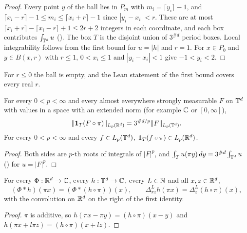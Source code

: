 \begin{proof}
\leanok
Every point $y$ of the ball lies in $P_m$ with $m_i = \lceil y_i \rceil - 1$, and
$\lceil x_i - r \rceil - 1 \leq m_i \leq \lceil x_i + r \rceil - 1$ since $|y_i - x_i| < r$. These
are at most $\lceil x_i + r \rceil - \lceil x_i - r \rceil + 1 \leq 2r + 2$ integers in each
coordinate, and each box contributes $\int_{\mathbb{T}^d} u$ (). The box $T$
is the disjoint union of $3^{\#d}$ period boxes. Local integrability follows from the first
bound for $u = |h|$ and $r = 1$. For $x \in P_0$ and $y \in B(x, r)$ with $r \leq 1$,
$0 < x_i \leq 1$ and $|y_i - x_i| < 1$ give $-1 < y_i < 2$.
\end{proof}
For $r \leq 0$ the ball is empty, and the Lean statement of the first bound covers every real $r$.

\begin{lemma}
\label{lem:triple-box-norm}
\leanok
{}
For every $0 < p < \infty$ and every almost everywhere strongly measurable $F$ on $\mathbb{T}^d$ with
values in a space with an extended norm (for example $\mathbb{C}$ or $[0, \infty]$),
\[
  \|\mathbf 1_T (F \circ \pi)\|_{L_p(\mathbb{R}^d)} = 3^{\#d/p} \|F\|_{L_p(\mathbb{T}^d)} .
\]
For every $0 < p < \infty$ and every $f \in L_p(\mathbb{T}^d)$, $\mathbf 1_T (f \circ \pi) \in L_p(\mathbb{R}^d)$.
\end{lemma}

\begin{proof}
\leanok
Both sides are $p$-th roots of integrals of $|F|^p$, and
$\int_T u(\pi y) \, dy = 3^{\#d} \int_{\mathbb{T}^d} u$ () for
$u = |F|^p$.
\end{proof}

\begin{lemma}
\label{lem:torus-lift-conv}
\leanok
{}
For every $\Phi : \mathbb{R}^d \to \mathbb{C}$, every $h : \mathbb{T}^d \to \mathbb{C}$, every $L \in \mathbb{N}$ and all
$x, z \in \mathbb{R}^d$,
\[
  (\Phi * h)(\pi x) = (\Phi * (h \circ \pi))(x), \qquad
  \Delta^L_{\pi z} h(\pi x) = \Delta^L_z (h \circ \pi)(x),
\]
with the convolution on $\mathbb{R}^d$ on the right of the first identity.
\end{lemma}

\begin{proof}
\leanok
$\pi$ is additive, so $h(\pi x - \pi y) = (h \circ \pi)(x - y)$ and
$h(\pi x + l \pi z) = (h \circ \pi)(x + l z)$.
\end{proof}

